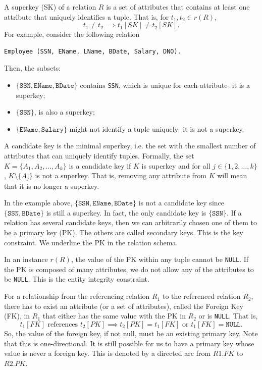 \documentclass[a4paper, openany]{memoir}
\begin{document}
A superkey (SK) of a relation $R$ is a set of attributes that contains at least one attribute that uniquely identifies a tuple. That is, for $t_1, t_2 \in r(R)$,
\[t_1 \neq t_2 \implies t_1[SK] \neq t_2[SK].\]
For example, consider the following relation
\begin{verbatim}
Employee (SSN, EName, LName, BDate, Salary, DNO).
\end{verbatim}
Then, the subsets:
\begin{itemize}
    \item $\{\texttt{SSN}, \texttt{EName}, \texttt{BDate}\}$ contains \texttt{SSN}, which is unique for each attribute- it is a superkey;
    \item $\{\texttt{SSN}\}$, is also a superkey;
    \item $\{\texttt{EName}, \texttt{Salary}\}$ might not identify a tuple uniquely- it is not a superkey.
\end{itemize}

A candidate key is the minimal superkey, i.e. the set with the smallest number of attributes that can uniquely identify tuples. Formally, the set $K = \{A_1, A_2, \dots, A_k\}$ is a candidate key if $K$ is superkey and for all $j \in \{1, 2, \dots, k\}$, $K \setminus \{A_j\}$ is not a superkey. That is, removing any attribute from $K$ will mean that it is no longer a superkey. 

In the example above, $\{\texttt{SSN}, \texttt{EName}, \texttt{BDate}\}$ is not a candidate key since $\{\texttt{SSN}, \texttt{BDate}\}$ is still a superkey. In fact, the only candidate key is $\{\texttt{SSN}\}$. If a relation has several candidate keys, then we can arbitrarily chosen one of them to be a primary key (PK). The others are called secondary keys. This is the key constraint. We underline the PK in the relation schema.

In an instance $r(R)$, the value of the PK within any tuple cannot be \texttt{NULL}. If the PK is composed of many attributes, we do not allow any of the attributes to be \texttt{NULL}. This is the entity integrity constraint. 

For a relationship from the referencing relation $R_1$ to the referenced relation $R_2$, there has to exist an attribute (or a set of attributes), called the Foreign Key (FK), in $R_1$ that either has the same value with the PK in $R_2$ or is \texttt{NULL}. That is,
\[t_1[FK] \text{ references } t_2[PK] \implies t_2[PK] = t_1[FK] \text{ or } t_1[FK] = \texttt{NULL}.\]
So, the value of the foreign key, if not null, must be an existing primary key. Note that this is one-directional. It is still possible for us to have a primary key whose value is never a foreign key. This is denoted by a directed arc from $R1.FK$ to $R2.PK$.
\end{document}
